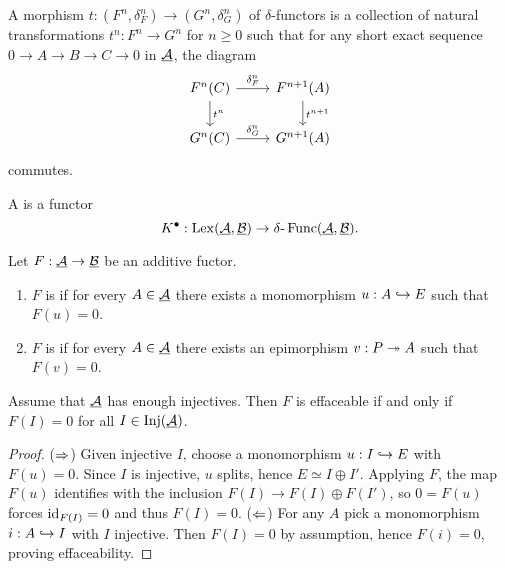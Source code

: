 \begin{definition*}
	A morphism \( t: (F^n, \delta_F^n) \to (G^n, \delta_G^n) \) of \( \delta \)-functors is a collection of natural transformations \( t^n: F^n \to G^n \) for \( n \ge 0 \) such that for any short exact sequence \( 0 \to A \to B \to C \to 0 \) in \( \underline{\mathcal{A}} \), the diagram
	\[
		\begin{tikzcd}
			F^n(C) \arrow[r,"\delta_F^n"] \arrow[d,"t^n"] & F^{n+1}(A) \arrow[d,"t^{n+1}"] \\
			G^n(C) \arrow[r,"\delta_G^n"] & G^{n+1}(A)
		\end{tikzcd}
	\]
	commutes.
\end{definition*}

\begin{definition*}
	A  is a functor
	\[
		K^\bullet: \operatorname{Lex}(\underline{\mathcal{A}}, \underline{\mathcal{B}}) \to \delta\text{-}\operatorname{Func}(\underline{\mathcal{A}}, \underline{\mathcal{B}}).
	\]
\end{definition*}

\begin{definition*}
	Let \( F: \underline{\mathcal{A}} \to \underline{\mathcal{B}} \) be an additive fuctor.
	\begin{enumerate}
		\item \( F \) is  if for every \( A \in \underline{\mathcal{A}} \) there exists a monomorphism \( u: A \hookrightarrow E \) such that \( F(u)=0 \).
		\item \( F \) is  if for every \( A \in \underline{\mathcal{A}} \) there exists an epimorphism \( v: P \twoheadrightarrow A \) such that \( F(v)=0 \).
	\end{enumerate}
\end{definition*}

\begin{lemma*}
	Assume that \( \underline{\mathcal{A}} \) has enough injectives. Then \( F \) is effaceable if and only if \( F(I)=0 \) for all \( I \in \operatorname{Inj}(\underline{\mathcal{A}}) \).
\end{lemma*}

\begin{proof}
	(\( \Rightarrow \)) Given injective \( I \), choose a monomorphism \( u: I \hookrightarrow E \) with \( F(u)=0 \). Since \( I \) is injective, \( u \) splits, hence \( E \simeq I \oplus I' \). Applying \( F \), the map \( F(u) \) identifies with the inclusion \( F(I) \to F(I) \oplus F(I') \), so \( 0 = F(u) \) forces \( \mathrm{id}_{F(I)}=0 \) and thus \( F(I)=0 \).
	(\( \Leftarrow \)) For any \( A \) pick a monomorphism \( i: A \hookrightarrow I \) with \( I \) injective. Then \( F(I)=0 \) by assumption, hence \( F(i)=0 \), proving effaceability.
\end{proof}

